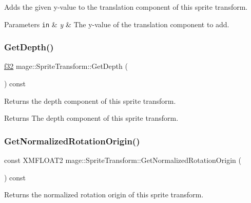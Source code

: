 Adds the given y-\/value to the translation component of this sprite transform.


\begin{DoxyParams}[1]{Parameters}
\mbox{\tt in}  & {\em y} & The y-\/value of the translation component to add. \\
\hline
\end{DoxyParams}
\hypertarget{structmage_1_1_sprite_transform_aef31bef0a6fe75283b33a059dc3d3ed9}{}\label{structmage_1_1_sprite_transform_aef31bef0a6fe75283b33a059dc3d3ed9} 
\subsubsection{\texorpdfstring{Get\+Depth()}{GetDepth()}}
{\footnotesize\ttfamily \hyperlink{namespacemage_a6a44ad388483959dc4dff9f2aef91431}{f32} mage\+::\+Sprite\+Transform\+::\+Get\+Depth (\begin{DoxyParamCaption}{ }\end{DoxyParamCaption}) const\hspace{0.3cm}{\ttfamily [noexcept]}}

Returns the depth component of this sprite transform.

\begin{DoxyReturn}{Returns}
The depth component of this sprite transform. 
\end{DoxyReturn}
\hypertarget{structmage_1_1_sprite_transform_aae811b88ac3cbd5ac18c67ddd81bef99}{}\label{structmage_1_1_sprite_transform_aae811b88ac3cbd5ac18c67ddd81bef99} 
\subsubsection{\texorpdfstring{Get\+Normalized\+Rotation\+Origin()}{GetNormalizedRotationOrigin()}}
{\footnotesize\ttfamily const X\+M\+F\+L\+O\+A\+T2 mage\+::\+Sprite\+Transform\+::\+Get\+Normalized\+Rotation\+Origin (\begin{DoxyParamCaption}{ }\end{DoxyParamCaption}) const}

Returns the normalized rotation origin of this sprite transform.

